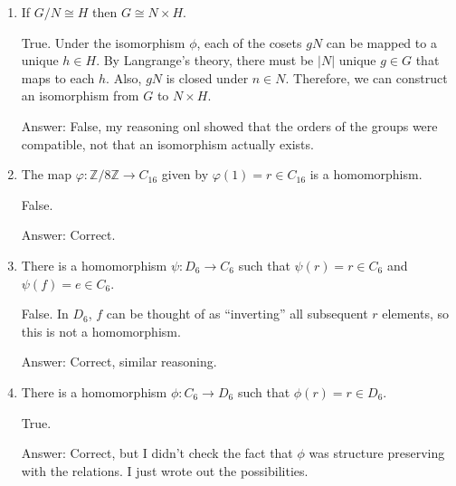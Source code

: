 \documentclass{article}
\begin{document}
\begin{enumerate}
{        False. This is only a normal subgroup if \(H\) is abelian.

        Answer: True. I reasoned incorrectly. If I were to correct my reasoning, 
        I would note that \(h * e_H = e_H * h = h\).
    }

    \item {
        If \(G/N \cong H\) then \(G \cong N \times H\).
    
        True. Under the isomorphism \(\phi\), each of the cosets \(gN\) can be 
        mapped to a unique \(h \in H\). By Langrange's theory, there must be 
        \(|N|\) unique \(g \in G\) that maps to each \(h\). Also, \(gN\) is 
        closed under \(n \in N\). Therefore, we can construct an isomorphism from 
        \(G\) to \(N \times H\).

        Answer: False, my reasoning onl showed that the orders of the groups were 
        compatible, not that an isomorphism actually exists.
    }

    \item {
        The map \(\varphi\colon \mathbb{Z}/8\mathbb{Z} \to C_{16}\) given by \(\varphi(1) = r \in C_{16}\) is a homomorphism.
    
        False.

        Answer: Correct.
    }

    \item {
        There is a homomorphism \(\psi\colon D_6 \to C_6\) such that \(\psi(r) = r \in C_6\) and \(\psi(f) = e \in C_6\).
    
        False. In \(D_6\), \(f\) can be thought of as ``inverting'' all subsequent 
        \(r\) elements, so this is not a homomorphism.

        Answer: Correct, similar reasoning.
    }

    \item {
        There is a homomorphism \(\phi\colon C_6 \to D_6\) such that \(\phi(r) = r \in D_6\).
    
        True.

        Answer: Correct, but I didn't check the fact that \(\phi\) was structure 
        preserving with the relations. I just wrote out the possibilities.
    }
\end{enumerate}
\end{document}
